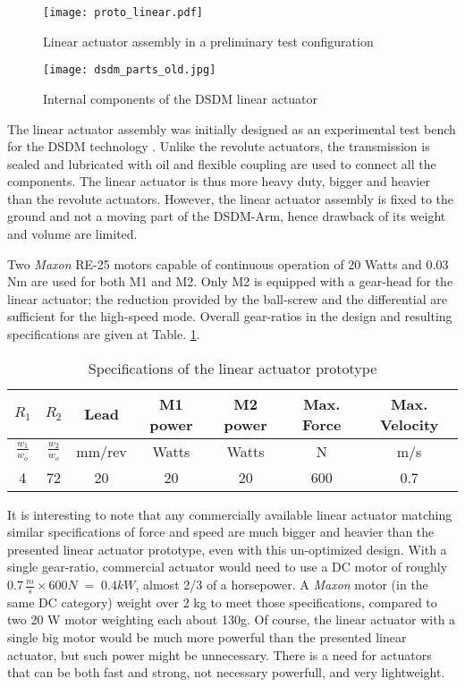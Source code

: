 \begin{figure}[htp]
	\centering
		\texttt{[image: proto\_linear.pdf]}
	\caption{Linear actuator assembly in a preliminary test configuration} 
	\label{fig:linact}
\end{figure}

\begin{figure}[htbp]
	\centering
		\texttt{[image: dsdm\_parts\_old.jpg]}
	\caption{Internal components of the DSDM linear actuator}
	\label{fig:dsdm_parts_old}
\end{figure}

The linear actuator assembly was initially designed as an experimental test bench for the DSDM technology \cite{girard_two-speed_2015}. Unlike the revolute actuators, the transmission is sealed and lubricated with oil and flexible coupling are used to connect all the components.  The linear actuator is thus more heavy duty, bigger and heavier than the revolute actuators. However, the linear actuator assembly is fixed to the ground and not a moving part of the DSDM-Arm, hence drawback of its weight and volume are limited. 

Two \textit{Maxon} RE-25 motors capable of continuous operation of 20 Watts and 0.03 Nm are used for both M1 and M2. Only M2 is equipped with a gear-head for the linear actuator; the reduction provided by the ball-screw and the differential are sufficient for the high-speed mode. Overall gear-ratios in the design and resulting specifications are given at Table. \ref{tab:specrev}.

\begin{table}[htbp]
	\centering
	\caption{Specifications of the linear actuator prototype}
		\begin{tabular}{ c c c c c c c }
			\hline
			$R_1$ & $R_2$ & Lead & M1 power & M2 power & Max. Force & Max. Velocity \\
			\hline
			$\frac{w_1}{w_o}$ & $\frac{w_2}{w_o}$ & mm/rev &Watts & Watts & N & m/s \\
			\hline \hline
			4 & 72 & 20 & 20 & 20 & 600 & 0.7 \\
			\hline
		\end{tabular}
	\label{tab:specrev}
\end{table}

It is interesting to note that any commercially available linear actuator matching similar specifications of force and speed are much bigger and heavier than the presented linear actuator prototype, even with this un-optimized design. With a single gear-ratio, commercial actuator would need to use a DC motor of roughly $0.7 \, \frac{m}{s} \times 600 N \; = \; 0.4 kW $, almost 2/3 of a horsepower. A \textit{Maxon} motor (in the same DC category) weight over 2 kg to meet those specifications, compared to two 20 W motor weighting each about 130g. Of course, the linear actuator with a single big motor would be much more powerful than the presented linear actuator, but such power might be unnecessary. There is a need for actuators that can be both fast and strong, not necessary powerfull, and very lightweight. 


